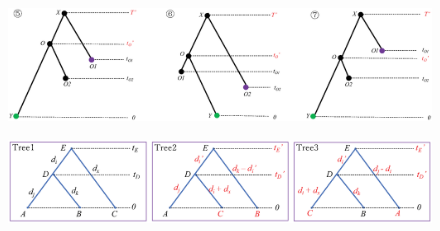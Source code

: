 \documentclass{bmcart}
\begin{document}
\begin{backmatter}
\begin{figure}[h!]
\includegraphics[width=12cm]{asymmetric.eps}\\
\caption{
             }
\label{asymmetric}
\end{figure}

\begin{figure}[h!]
\includegraphics[width=12cm]{bigpulleyExp.eps}\\
\caption{
             }
\label{sampleprior}
\end{figure}


\end{backmatter}
\end{document}
